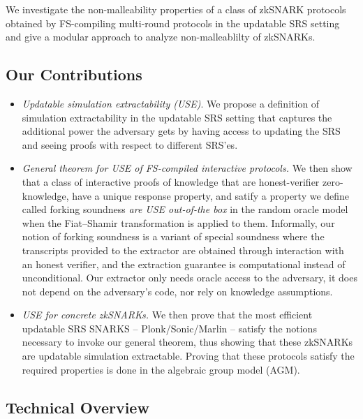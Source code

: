 We investigate the non-malleability properties of a class of zkSNARK protocols obtained by FS-compiling multi-round protocols in the updatable SRS setting and give a modular approach to analyze non-malleablilty of zkSNARKs.

\subsection{Our Contributions}
\begin{itemize}
\item 
\emph{Updatable simulation extractability (USE)}. 
We propose a definition of simulation extractability in the updatable SRS setting that captures the additional power the adversary gets by having access to updating the SRS and seeing proofs with respect to different SRS'es.
    
\item 
\emph{General theorem for USE of FS-compiled interactive protocols.}
We then show that a class of interactive proofs of knowledge that are honest-verifier zero-knowledge,
have a unique response property, and satify a property we define called forking soundness \emph{are USE out-of-the box} in the random oracle model when the Fiat--Shamir transformation is applied to them. 
Informally, our notion of forking soundness is a variant of special soundness where the transcripts provided to the extractor are
obtained through interaction with an honest verifier, and the extraction guarantee is computational instead of unconditional. 
Our extractor only needs oracle access to the adversary, it does not depend on the adversary’s code, nor rely on knowledge
assumptions.
    
\item
\emph{USE for concrete zkSNARKs.}
We then prove that the most efficient updatable SRS SNARKS -- Plonk/Sonic/Marlin -- satisfy the notions necessary to invoke our general theorem, thus showing that these zkSNARKs are updatable simulation extractable.
Proving that these protocols satisfy the required properties is done in the algebraic group model (AGM).
	
\end{itemize}



\subsection{Technical Overview}

